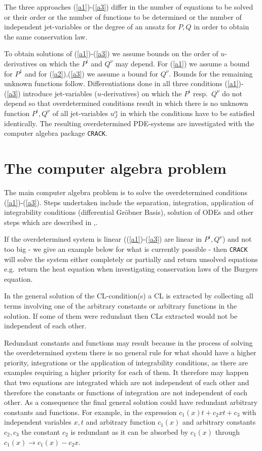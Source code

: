 The three approaches (\ref{a1})-(\ref{a3})
differ in the number of equations to be solved or their order or the
number of functions to be determined or the number of independent
jet-variables or the degree of an ansatz for $P,Q$ in order to
obtain the same conservation law.

To obtain solutions of (\ref{a1})-(\ref{a3}) we assume
bounds on the order of $u$-derivatives on which the $P^i$ and $Q^{\nu}$
may depend. For (\ref{a1}) we assume a bound for $P^1$ and for
(\ref{a2}),(\ref{a3}) we assume a bound for $Q^{\nu}$.
Bounds for the remaining unknown functions follow.
Differentiations done in all three conditions
(\ref{a1})-(\ref{a3}) introduce jet-variables ($u$-derivatives)
on which the $P^i$ resp.\ $Q^{\nu}$ do not depend so that overdetermined
conditions result in which there is no unknown function $P^i,Q^{\nu}$
of all jet-variables $u^{\alpha}_{J}$
in which the conditions have to be satisfied identically.
The resulting overdetermined
PDE-systems are investigated with the computer algebra
package {\tt CRACK}.

\section{The computer algebra problem}
The main computer algebra problem is to solve the overdetermined
conditions (\ref{a1})-(\ref{a3}). Steps undertaken
include the separation, integration, application of integrability
conditions (differential Gr\"{o}bner Basis), solution of ODEs and other steps
which are described in \cite{CRACK1},\cite{CRACK2}.

If the overdetermined system is linear ((\ref{a1})-(\ref{a3}) are
linear in $P^i,Q^{\nu}$)  and not too big - we give an example below
for what is currently possible - then {\tt CRACK} will solve the
system either completely or partially and return unsolved equations
e.g.\ return the heat equation when investigating conservation laws of the
Burgers equation.

In the general solution of the CL-condition(s) a CL is extracted by
collecting all terms involving one of the arbitrary constants or
arbitrary functions in the solution. If some of them were redundant
then CLs extracted would not be independent of each other.

Redundant constants and functions may result because
in the process of solving the overdetermined system there is no general
rule for what should have a higher priority, integrations or
the application of integrability conditions,
as there are examples requiring a higher priority for each of them.
It therefore may happen that
two equations are integrated which are not independent of each
other and therefore the constants or functions of integration are
not independent of each other. As a consequence the final general
solution could have redundant arbitrary constants and functions.
For example, in the expression $c_1(x) t + c_2 x t + c_3$ with
independent variables $x,t$ and arbitrary function $c_1(x)$ and
arbitrary constants $c_2,c_3$ the constant $c_2$ is redundant
as it can be absorbed by $c_1(x)$ through $c_1(x) \rightarrow
c_1(x) - c_2 x$.

